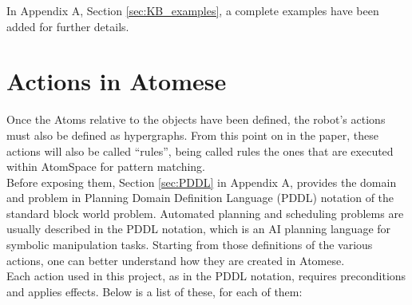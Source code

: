 In Appendix A, Section \ref{sec:KB_examples}, a complete examples have been added for further details.

\section{Actions in Atomese}\label{sec:domain_atomese}
Once the Atoms relative to the objects have been defined, the robot's actions must also be defined as hypergraphs. 
From this point on in the paper, these actions will also be called \enquote{rules}, being called rules the ones that are executed within AtomSpace for pattern matching. \\
Before exposing them, Section \ref{sec:PDDL} in Appendix A, provides the domain and problem in Planning Domain Definition Language (PDDL) notation of the standard block world problem.
Automated planning and scheduling problems are usually described in the PDDL notation, which is an AI planning language for symbolic manipulation tasks.
Starting from those definitions of the various actions, one can better understand how they are created in Atomese. \\

Each action used in this project, as in the PDDL notation, requires preconditions and applies effects. Below is a list of these, for each of them:

